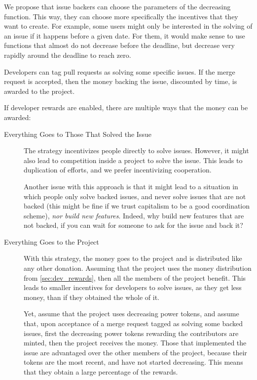 We propose that issue backers can choose the parameters of the decreasing function.
This way, they can choose more specifically the incentives that they want to create.
For example, some users might only be interested in the solving of an issue if it happens before a given date.
For them, it would make sense to use functions that almost do not decrease before the deadline, but decrease very rapidly around the deadline to reach zero.

Developers can tag pull requests as solving some specific issues.
If the merge request is accepted, then the money backing the issue, discounted by time, is awarded to the project.

If developer rewards are enabled, there are multiple ways that the money can be awarded:

\begin{description}
  \item[Everything Goes to Those That Solved the Issue]
    The strategy incentivizes people directly to solve issues.
    However, it might also lead to competition inside a project to solve the issue.
    This leads to duplication of efforts, and we prefer incentivizing cooperation.

    Another issue with this approach is that it might lead to a situation in which people only solve backed issues, and never solve issues that are not backed (this might be fine if we trust capitalism to be a good coordination scheme), \emph{nor build new features}.
    Indeed, why build new features that are not backed, if you can wait for someone to ask for the issue and back it?

  \item[Everything Goes to the Project]
    With this strategy, the money goes to the project and is distributed like any other donation.
    Assuming that the project uses the money distribution from \cref{sec:dev_rewards}, then all the members of the project benefit.
    This leads to smaller incentives for developers to solve issues, as they get less money, than if they obtained the whole of it.

    Yet, assume that the project uses decreasing power tokens, and assume that, upon acceptance of a merge request tagged as solving some backed issues, first the decreasing power tokens rewarding the contributors are minted, then the project receives the money.
    Those that implemented the issue are advantaged over the other members of the project, because their tokens are the most recent, and have not started decreasing.
    This means that they obtain a large percentage of the rewards.
\end{description}

